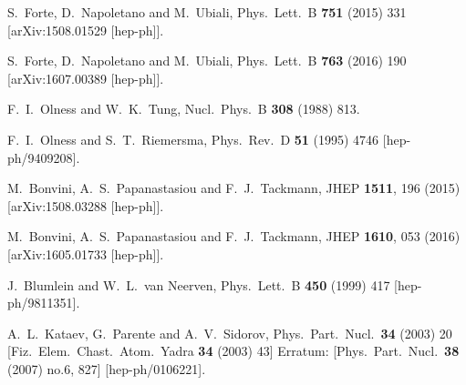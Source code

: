 \documentclass[letter,11pt]{article}
\begin{document}
\begin{thebibliography}{99}
  S.~Forte, D.~Napoletano and M.~Ubiali,
  Phys.\ Lett.\ B {\bf 751} (2015) 331
  [arXiv:1508.01529 [hep-ph]].
  
  S.~Forte, D.~Napoletano and M.~Ubiali,
  Phys.\ Lett.\ B {\bf 763} (2016) 190
  [arXiv:1607.00389 [hep-ph]].
  
  F.~I.~Olness and W.~K.~Tung,
  Nucl.\ Phys.\ B {\bf 308} (1988) 813.

  F.~I.~Olness and S.~T.~Riemersma,
  Phys.\ Rev.\ D {\bf 51} (1995) 4746
  [hep-ph/9409208].

  M.~Bonvini, A.~S.~Papanastasiou and F.~J.~Tackmann,
  JHEP {\bf 1511}, 196 (2015)
  [arXiv:1508.03288 [hep-ph]].

  M.~Bonvini, A.~S.~Papanastasiou and F.~J.~Tackmann,
  JHEP {\bf 1610}, 053 (2016)
  [arXiv:1605.01733 [hep-ph]].
  
  J.~Blumlein and W.~L.~van Neerven,
  Phys.\ Lett.\ B {\bf 450} (1999) 417
  [hep-ph/9811351].

  A.~L.~Kataev, G.~Parente and A.~V.~Sidorov,
  Phys.\ Part.\ Nucl.\  {\bf 34} (2003) 20
   [Fiz.\ Elem.\ Chast.\ Atom.\ Yadra {\bf 34} (2003) 43]
   Erratum: [Phys.\ Part.\ Nucl.\  {\bf 38} (2007) no.6,  827]
  [hep-ph/0106221].


\end{thebibliography}
\end{document}
